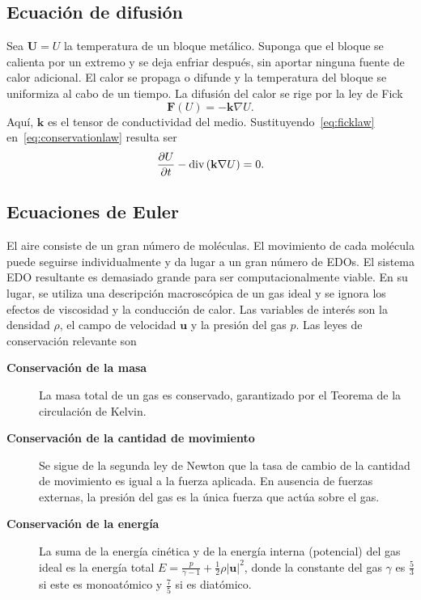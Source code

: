 \subsection*{Ecuación de difusión}

Sea $\mathbf{U}=U$ la temperatura de un bloque metálico.
Suponga que el bloque se calienta por un extremo y se deja enfriar
después, sin aportar ninguna fuente de calor adicional.
El calor se propaga o difunde y la temperatura del bloque se
uniformiza al cabo de un tiempo.
La difusión del calor se rige por la ley de Fick
\begin{equation}\label{eq:ficklaw}
	\mathbf{F}\left(U\right)=
	-\mathbf{k}\nabla U.
\end{equation}
Aquí, $\mathbf{k}$ es el tensor de conductividad del medio.
Sustituyendo~\eqref{eq:ficklaw} en~\eqref{eq:conservationlaw}
resulta ser
\begin{equation}
	\diffp{U}{t}-
	\operatorname{div}
	\left(\mathbf{k}\nabla U\right)=
	0.
\end{equation}

\subsection*{Ecuaciones de Euler}

El aire consiste de un gran número de moléculas.
El movimiento de cada molécula puede seguirse individualmente y
da lugar a un gran número de EDOs.
El sistema EDO resultante es demasiado grande para ser
computacionalmente viable.
En su lugar, se utiliza una descripción macroscópica de un gas ideal
y se ignora los efectos de viscosidad y la conducción de calor.
Las variables de interés son la densidad $\rho$, el campo de
velocidad $\mathbf{u}$ y la presión del gas $p$.
Las leyes de conservación relevante son

\begin{description}
	\item[\bfseries Conservación de la masa]

	      La masa total de un gas es conservado, garantizado
	      por el Teorema de la circulación de Kelvin. %

	\item[\bfseries Conservación de la cantidad de movimiento]

	      Se sigue de la segunda ley de Newton que la tasa de cambio de
	      la cantidad de movimiento es igual a la fuerza aplicada.
	      En ausencia de fuerzas externas, la presión del gas es la
	      única fuerza que actúa sobre el gas.

	\item[\bfseries Conservación de la energía]

	      La suma de la energía cinética y de la energía interna
	      (potencial) del gas ideal es la energía total
	      \begin{math}
		      E=
		      \frac{p}{\gamma-1}+
		      \frac{1}{2}
		      \rho{\left|\mathbf{u}\right|}^{2}
	      \end{math},
	      donde la constante del gas $\gamma$ es $\frac{5}{3}$ si este
	      es monoatómico y $\frac{7}{5}$ si es diatómico.
\end{description}

